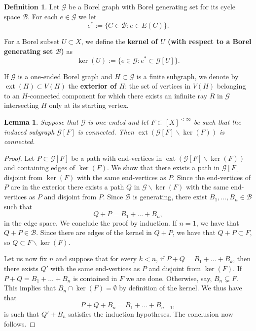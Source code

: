 \documentclass[letterpaper,11pt,reqno]{amsart}
\theoremstyle{bfnote}
\newtheorem{lemma}[theorem]{Lemma}
\theoremstyle{definition}
\newtheorem{definition}[theorem]{Definition}
\DeclareMathOperator{\ext}{ext}
\newcommand{\0}{\varnothing}
\numberwithin{equation}{section}
\begin{document}
\begin{definition}
Let $\mathcal{G}$ be a Borel graph with Borel generating set for its cycle space $\mathcal B$. For each $e\in \mathcal{G}$ we let $$
e^\ast := \{C \in \mathcal B : e \in E(C)\}.
$$

For a Borel subset $U\subset X$, we define the \textbf{kernel of $U$ (with respect to a Borel generating set $\mathcal B$)} as $$
\ker (U) := \{e \in \mathcal{G} : e^\ast \subset \mathcal{G}[U]\}.
$$ 
\end{definition}

If $\mathcal G$ is a one-ended Borel graph and $H \subset \mathcal G$ is a finite subgraph, we denote by $\ext (H) \subset V(H)$ the \textbf{exterior of $H$}: the set of vertices in $V(H)$ belonging to an $H$-connected component for which there exists an infinite ray $R$ in $\mathcal G$ intersecting $H$ only at its starting vertex.

\begin{lemma}\label{lem:exterior.conn}
    Suppose that $\mathcal{G}$ is one-ended and let $F\subset [
    X]^{<\infty}$ be such that the induced subgraph $\mathcal{G} [F]$ is connected. Then $\ext(\mathcal G[F] \backslash \ker (F))$ is connected.
\end{lemma}

\begin{proof}
    Let $P \subset \mathcal{G}[F]$ be a path with end-vertices in $\ext(\mathcal G[F] \backslash \ker (F))$ and containing edges of $\ker (F)$. We show that there exists a path in $\mathcal G[F]$ disjoint from $\ker (F)$ with the same end-vertices as $P$. 
    Since the end-vertices of $P$ are in the exterior there exists a path $Q$ in $\mathcal{G} \backslash \ker (F)$ with the same end-vertices as $P$ and disjoint from $P$. Since $\mathcal B$ is generating, there exist $B_1, \dots, B_n \in \mathcal B$ such that $$
    Q+P = B_1 +\ldots + B_n,
    $$
    in the edge space. We conclude the proof by induction. If $n=1$, we have that $Q + P \in \mathcal B$. Since there are edges of the kernel in $Q+P$, we have that $Q+P \subset F$, so $Q \subset F \backslash \ker (F)$.

    Let us now fix $n$ and suppose that for every $k < n$, if $P + Q = B_1 +\dots + B_k$, then there exists $Q'$ with the same end-vertices as $P$ and disjoint from $\ker (F)$. If $P + Q = B_1 +\dots + B_n$ is contained in $F$ we are done. Otherwise, say, $B_n \subsetneq F$. This implies that $B_n \cap \ker (F) = \emptyset$ by definition of the kernel. We thus have that $$
    P + Q + B_n = B_1 + \ldots+ B_{n-1},
    $$
    is such that $Q' + B_n$ satisfies the induction hypotheses. The conclusion now follows.
\end{proof}
\end{document}
